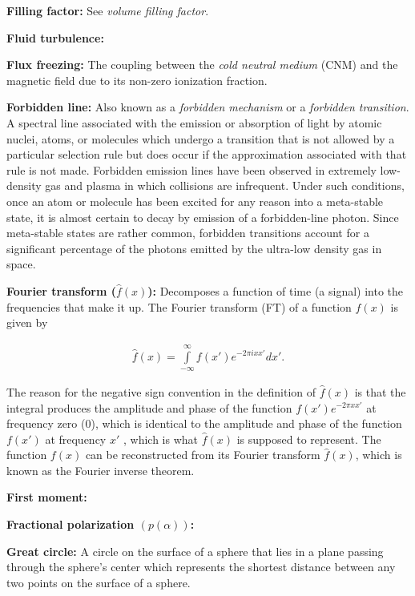 \documentclass[a4paper,11pt]{article}
\begin{document}
{\noindent}\textbf{Filling factor:} See \textit{volume filling factor}.

{\noindent}\textbf{Fluid turbulence:}

{\noindent}\textbf{Flux freezing:} The coupling between the \textit{cold neutral medium} (CNM) and the magnetic field due to its non-zero ionization fraction.

{\noindent}\textbf{Forbidden line:} Also known as a \textit{forbidden mechanism} or a \textit{forbidden transition}. A spectral line associated with the emission or absorption of light by atomic nuclei, atoms, or molecules which undergo a transition that is not allowed by a particular selection rule but does occur if the approximation associated with that rule is not made. Forbidden emission lines have been observed in extremely low-density gas and plasma in which collisions are infrequent. Under such conditions, once an atom or molecule has been excited for any reason into a meta-stable state, it is almost certain to decay by emission of a forbidden-line photon. Since meta-stable states are rather common, forbidden transitions account for a significant percentage of the photons emitted by the ultra-low density gas in space.

{\noindent}\textbf{Fourier transform ($\hat{f}(x)$):} Decomposes a function of time (a signal) into the frequencies that make it up. The Fourier transform (FT) of a function $f(x)$ is given by

\begin{align*}
    \hat{f}(x) = \int\limits_{-\infty}^\infty f(x')e^{-2\pi ixx'}dx'.
\end{align*}

{\noindent}The reason for the negative sign convention in the definition of $\hat{f}(x)$ is that the integral produces the amplitude and phase of the function $f(x')e^{-2\pi xx'}$ at frequency zero ($0$), which is identical to the amplitude and phase of the function $f(x')$ at frequency $x'$ , which is what $\hat{f}(x)$ is supposed to represent. The function $f(x)$ can be reconstructed from its Fourier transform $\hat{f}(x)$, which is known as the Fourier inverse theorem.

{\noindent}\textbf{First moment:} 

{\noindent}\textbf{Fractional polarization $(p(\alpha))$:}

{\noindent}\textbf{Great circle:} A circle on the surface of a sphere that lies in a plane passing through the sphere's center which represents the shortest distance between any two points on the surface of a sphere.
\end{document}
